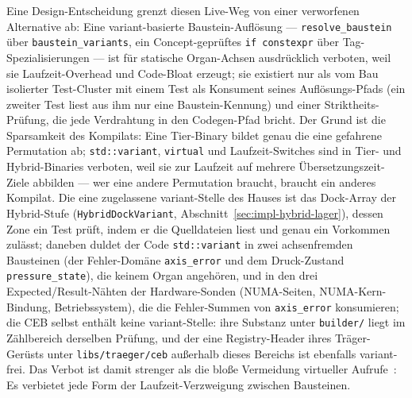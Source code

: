 \begin{nurlang}
Eine Design-Entscheidung grenzt diesen Live-Weg von einer verworfenen Alternative ab: Eine
variant-basierte Baustein-Auflösung --- \texttt{resolve\_baustein} über \texttt{baustein\_variants}, ein
Concept-geprüftes \texttt{if constexpr} über Tag-Spezialisierungen --- ist für statische Organ-Achsen
ausdrücklich verboten, weil sie Laufzeit-Overhead und Code-Bloat erzeugt; sie existiert nur als
vom Bau isolierter Test-Cluster mit einem Test als Konsument seines Auflösungs-Pfads (ein zweiter Test liest aus
ihm nur eine Baustein-Kennung) und einer Striktheits-Prüfung, die jede
Verdrahtung in den Codegen-Pfad bricht. Der Grund ist die Sparsamkeit des Kompilats: Eine Tier-Binary
bildet genau die eine gefahrene Permutation ab; \texttt{std::variant}, \texttt{virtual} und
Laufzeit-Switches sind in Tier- und Hybrid-Binaries verboten, weil sie zur Laufzeit auf mehrere
Übersetzungszeit-Ziele abbilden --- wer eine andere Permutation braucht, braucht ein anderes Kompilat. Die
eine zugelassene variant-Stelle des Hauses ist das Dock-Array der Hybrid-Stufe
(\texttt{HybridDockVariant}, Abschnitt~\ref{sec:impl-hybrid-lager}), dessen Zone ein Test prüft, indem er
die Quelldateien liest und genau ein Vorkommen zulässt; daneben duldet der Code \texttt{std::variant} in
zwei achsenfremden Bausteinen (der Fehler-Domäne \texttt{axis\_error} und dem
Druck-Zustand \texttt{pressure\_state}), die keinem Organ angehören, und in den drei Expected/Result-Nähten
der Hardware-Sonden (NUMA-Seiten, NUMA-Kern-Bindung, Betriebssystem), die die Fehler-Summen von
\texttt{axis\_error} konsumieren; die CEB selbst enthält keine variant-Stelle: ihre Substanz unter
\texttt{builder/} liegt im Zählbereich derselben Prüfung, und der eine Registry-Header ihres
Träger-Gerüsts unter \texttt{libs/traeger/ceb} außerhalb dieses Bereichs ist ebenfalls variant-frei.
Das Verbot ist damit strenger als
die bloße Vermeidung virtueller Aufrufe~\cite{alexandrescu2001modern}: Es verbietet jede Form der
Laufzeit-Verzweigung zwischen Bausteinen.
\end{nurlang}
